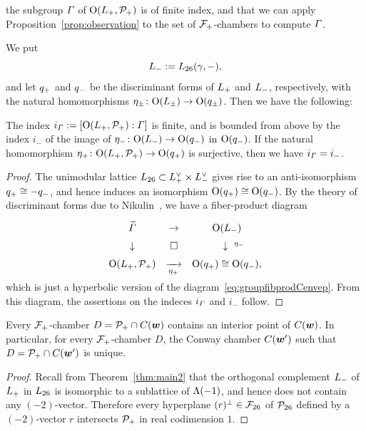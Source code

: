 \documentclass{amsart} %
\begin{document}
the subgroup $\varGamma$ of $ \mathord{\mathrm{O}}(L_{+}, \mathord{\mathcal{P}}_{+})$ is of finite index,
and that we can apply
Proposition~\ref{prop:observation}
to the set of $\mathord{\mathcal{F}}_{+}$-chambers
to compute $\varGamma$.
%
\par
We put 
\[
L_{-}:=L_{26}(\gamma, -),
\]
and let $q_{+}$ and $q_{-}$ be the discriminant forms 
of $L_{+}$ and $L_{-}$, respectively,
with the natural homomorphisms $\eta_{\pm}\colon \mathord{\mathrm{O}}(L_{\pm})\to \mathord{\mathrm{O}}(q_{\pm})$.
Then we have the following:
%
\begin{proposition}\label{prop:vGamindex}
The index $i_{\varGamma}:=[\mathord{\mathrm{O}}(L_{+}, \mathord{\mathcal{P}}_{+}): \varGamma]$ 
is finite, and is bounded from above by the index $i_{-}$ of the image 
of ${\eta}_{-}\colon \mathord{\mathrm{O}}(L_{-}) \to \mathord{\mathrm{O}}(q_{-})$ 
in $\mathord{\mathrm{O}}(q_{-})$.
If the natural homomorphism ${\eta}_{+}\colon \mathord{\mathrm{O}}(L_{+}, \mathord{\mathcal{P}}_{+}) \to \mathord{\mathrm{O}}(q_{+})$ is surjective, 
then we have $i_{\varGamma}=i_{-}$.
\end{proposition}
%
\begin{proof}
The unimodular lattice $L_{26}\subset L_{+}^{\vee}\times L_{-}^{\vee}$ 
gives rise to an anti-isomorphism $q_{+}\cong -q_{-}$, 
and hence induces an isomorphism
$\mathord{\mathrm{O}}(q_{+})\cong \mathord{\mathrm{O}}(q_{-})$.
By the theory of discriminant forms due to Nikulin~\cite{MR525944}, 
we have a fiber-product diagram
%
\begin{equation}\label{eq:groupfibprodP}
\renewcommand{\arraystretch}{1.5}
\begin{array}{ccc}
\tilvGam &\to & \OG(\Lminus) \\
\downarrow & \square& \downarrow\rlap{ ${}^{\etaminus}$} \\
\OG(\Lplus, \PPPplus) & \maprightsb{\etaplus} & \OG(\qplus)\cong \OG(\qminus), 
\end{array}
\end{equation}
% 
which is just 
a hyperbolic version of the diagram~\eqref{eq:groupfibprodCenvep}.
From this diagram, the assertions on the indeces $i_{\varGamma}$ and $i_{-}$ follow.
\end{proof}
%
%
\begin{proposition}\label{prop:interior}
Every $\mathord{\mathcal{F}}_{+}$-chamber $D=\mathord{\mathcal{P}}_{+} \cap \mathord{C}(\boldsymbol{w})$
contains an interior point of $ \mathord{C}(\boldsymbol{w})$.
In particular, for every $\mathord{\mathcal{F}}_{+}$-chamber $D$,
the Conway chamber $ \mathord{C}(\boldsymbol{w}^{\prime}) $
such that $D=\mathord{\mathcal{P}}_{+} \cap \mathord{C}(\boldsymbol{w}^{\prime})$ is unique.
\end{proposition}
%
\begin{proof}
Recall from Theorem~\ref{thm:main2} that 
the orthogonal complement $L_{-}$
 of $L_{+}$ in $L_{26}$
is isomorphic to a sublattice of $\Lambda(-1)$,
and hence does not contain any $(-2)$-vector.
Therefore every hyperplane $(r)^{\perp}\in {\mathord{\mathcal{F}}}_{26}$ of $\mathord{\mathcal{P}}_{26}$ defined by a $(-2)$-vector $r$ 
intersects $\mathord{\mathcal{P}}_{+}$ in real codimension $1$.
\end{proof}
\end{document}
